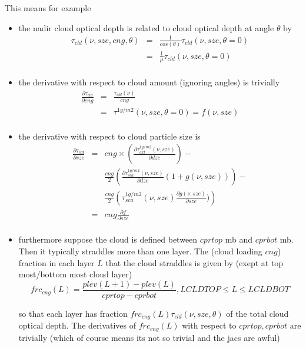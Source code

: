 \documentclass[11pt]{article}
\begin{document}
This means for example 
\begin{itemize}
\item the nadir cloud optical depth is related to cloud optical depth at angle $\theta$ by
\begin{eqnarray*}
 \tau_{cld}(\nu,sze,cng,\theta) & = & \frac{1}{cos(\theta)} \tau_{cld}(\nu,sze,\theta = 0) \\
                          & = & \frac{1}{\mu} \tau_{cld}(\nu,sze,\theta = 0) \\
\end{eqnarray*}

\item the derivative with respect to cloud amount (ignoring angles) is trivially
\begin{eqnarray*}
\frac{\partial \tau_{cld}}{\partial cng} & = & \frac{\tau_{cld}(\nu)}{cng} \\
                                   & = & \tau^{1g/m2}(\nu,sze,\theta = 0) = f(\nu,sze) \\
\end{eqnarray*}

\item the derivative with respect to cloud particle size is
\begin{eqnarray*}
\frac{\partial \tau_{cld}}{\partial sze} & = & cng \times  \left( \frac{\partial \tau^{1g/m2}_{ext}(\nu,sze)}{\partial dze} \right) - \\
                                         &   & \frac{cng}{2} \left( \frac{\partial \tau^{1g/m2}_{sca}(\nu,sze)}{\partial dze} (1 + g(\nu,sze)) \right) - \\
                                         &   & \frac{cng}{2}  \left(  \tau^{1g/m2}_{sca}(\nu,sze) \frac{\partial g(\nu,sze)}{\partial sze}) \right) \\
                                         & = & cng \frac{\partial f}{\partial sze} \\
\end{eqnarray*}

\item furthermore suppose the cloud is defined between $cprtop$ mb and
  $cprbot$ mb. Then it typically straddles more than one layer. The
  (cloud loading $cng$) fraction in each layer $L$ that the cloud
  straddles is given by (exept at top most/bottom most cloud layer)
\[
  frc_{cng}(L) = \frac{plev(L+1)-plev(L)}{cprtop-cprbot}, LCLDTOP \le L \le LCLDBOT
\]

so that each layer has fraction $frc_{cng}(L)
\tau_{cld}(\nu,sze,\theta)$ of the total cloud optical depth. The
derivatives of $frc_{cng}(L)$ with respect to $cprtop,cprbot$ are
trivially (which of course means its not so trivial and the jacs are awful)


\end{itemize}
\end{document}
